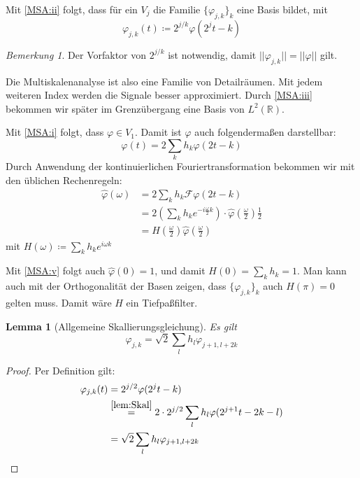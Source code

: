 \documentclass[]{scrartcl}
\theoremstyle{plain}
\newtheorem{lem}[theo]{Lemma}
\theoremstyle{remark}
\newtheorem*{bem}{Bemerkung}
\newcommand{\lR}{L^2(\mathbb{R})}
\begin{document}
    Mit \autoref{MSA:ii} folgt, dass für ein $V_j$ die Familie $\{\varphi_{j,k}\}_k$ eine Basis bildet, mit $$\varphi_{j,k} (t) \coloneqq 2^{j/k} \varphi(2^j t - k)$$

    \begin{bem}
        Der Vorfaktor von $2^{j/k}$ ist notwendig, damit 
        $||\varphi_{j,k}|| = ||\varphi||$ gilt.
    \end{bem}

    Die Multiskalenanalyse ist also eine Familie von Detailräumen. Mit jedem weiteren Index werden die Signale besser approximiert. Durch \autoref{MSA:iii} bekommen wir später im Grenzübergang eine Basis von $\lR$.

    Mit \autoref{MSA:i} folgt, dass $\varphi \in V_1$. Damit ist $\varphi$ auch folgendermaßen darstellbar:
    $$\varphi(t) = 2 \sum_k h_k \varphi(2t - k)$$
    Durch Anwendung der kontinuierlichen Fouriertransformation bekommen wir mit den üblichen Rechenregeln:
    \begin{align*}
        \hat{\varphi}(\omega) &= 2 \sum_k h_k \mathcal{F} \varphi(2t - k) \\
                            &= 2 (\sum_k h_k e^{-i \frac{\omega}{2}k}) \cdot \hat{\varphi}(\frac{\omega}{2}) \frac{1}{2} \\
                            &= H(\frac{\omega}{2}) \hat{\varphi}(\frac{\omega}{2})
    \end{align*} mit $H(\omega) \coloneqq \sum_k h_k e^{i\omega k}$
    
    Mit \autoref{MSA:v} folgt auch $\hat{\varphi}(0) = 1$, und damit $H(0) = \sum_k h_k = 1$. Man kann auch mit der Orthogonalität der Basen zeigen, dass $\{\varphi_{j,k}\}_k$ auch $H(\pi) = 0$ gelten muss. Damit wäre $H$ ein Tiefpaßfilter.

    \begin{lem}[Allgemeine Skallierungsgleichung]
        Es gilt \label{lem:Skal}
        $$\varphi_{j,k} = \sqrt{2} \sum_l h_l \varphi_{j+1, l+2k}$$
    \end{lem}

    \begin{proof} Per Definition gilt:
        \begin{align*}
            \varphi_{j, k} (t) &= 2^{j/2} \varphi(2^j t - k) \\
            &\stackrel{\autoref{lem:Skal}}{=} 2 \cdot 2^{j/2} \sum_l h_l \varphi(2^{j+1} t -2k -l) \\
            &= \sqrt{2} \sum_l h_l \varphi_{j+1, l + 2k}
        \end{align*}
    \end{proof}
\end{document}
